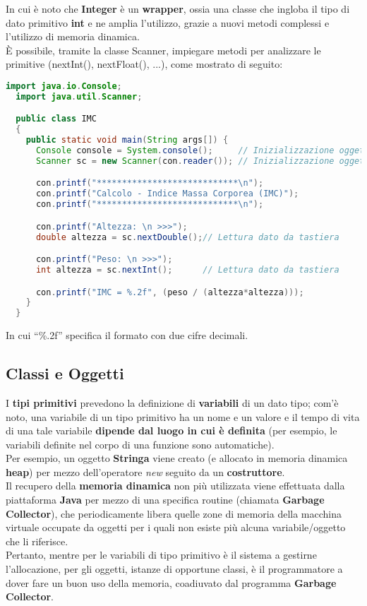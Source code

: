 \documentclass[a4paper]{extarticle}
\newcommand{\quotes}[1]{``#1''}
\begin{document}
\vspace{1em}
\noindent
In cui è noto che \textbf{Integer} è un \textbf{wrapper}, ossia una classe che ingloba il tipo di dato primitivo \textbf{int} e ne amplia l'utilizzo, grazie a nuovi metodi complessi e l'utilizzo di memoria dinamica.\\
È possibile, tramite la classe Scanner, impiegare metodi per analizzare le primitive (nextInt(), nextFloat(), ...), come mostrato di seguito:

\vspace{1em}
\noindent
\begin{lstlisting}[language=Java, caption=Calcolo Indice Massa Corporea in Java]
  import java.io.Console;
  import java.util.Scanner;

  public class IMC
  {
    public static void main(String args[]) {
      Console console = System.console();     // Inizializzazione oggetto Console
      Scanner sc = new Scanner(con.reader()); // Inizializzazione oggetto Scanner

      con.printf("****************************\n");
      con.printf("Calcolo - Indice Massa Corporea (IMC)");
      con.printf("****************************\n");

      con.printf("Altezza: \n >>>");
      double altezza = sc.nextDouble();// Lettura dato da tastiera

      con.printf("Peso: \n >>>");
      int altezza = sc.nextInt();      // Lettura dato da tastiera

      con.printf("IMC = %.2f", (peso / (altezza*altezza)));
    }
  }
\end{lstlisting}

\vspace{1em}
\noindent
In cui \quotes{\%.2f} specifica il formato con due cifre decimali.

\vspace{1em}
\subsection{Classi e Oggetti}
I \textbf{tipi primitivi} prevedono la definizione di \textbf{variabili} di un dato tipo; com'è noto, una variabile di un tipo primitivo ha un nome e un valore e il tempo di vita di una tale variabile \textbf{dipende dal luogo in cui è definita} (per esempio, le variabili definite nel corpo di una funzione sono automatiche).\\
Per esempio, un oggetto \textbf{Stringa} viene creato (e allocato in memoria dinamica \textbf{heap}) per mezzo dell’operatore \emph{new} seguito da un \textbf{costruttore}.\\
Il recupero della \textbf{memoria dinamica} non più utilizzata viene effettuata dalla piattaforma \textbf{Java} per mezzo di una specifica routine (chiamata \textbf{Garbage Collector}), che periodicamente libera quelle zone di memoria della macchina virtuale occupate da oggetti per i quali non esiste più alcuna variabile/oggetto che li riferisce.\\
Pertanto, mentre per le variabili di tipo primitivo è il sistema a gestirne l'allocazione, per gli oggetti, istanze di opportune classi, è il programmatore a dover fare un buon uso della memoria, coadiuvato dal programma \textbf{Garbage Collector}.
\end{document}
